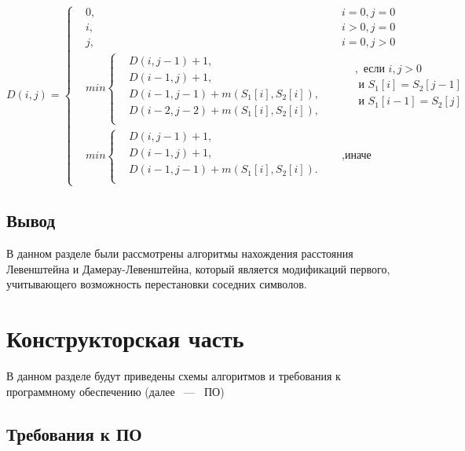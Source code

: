 \documentclass[14pt,russian]{scrartcl}
\begin{document}
\[ D(i, j) =  \left\{
	\begin{aligned}
		  & 0, &   & i = 0, j = 0 \\
		  & i, &   & i > 0, j = 0 \\
		  & j, &   & i = 0, j > 0 \\		    	
		&min \left\{
		\begin{aligned}
		&D(i, j - 1) + 1,\\
		&D(i - 1, j) + 1,\\
		&D(i - 1, j - 1) + m(S_{1}[i], S_{2}[i]), \\
		&D(i - 2, j - 2) + m(S_{1}[i], S_{2}[i]),\\
	\end{aligned} \right.
	&& 
	\begin{aligned}
		  & , \text{ если } i, j > 0         \\
		  & \text{ и } S_{1}[i] = S_{2}[j - 1]  \\
		  & \text{ и } S_{1}[i - 1] =  S_{2}[j] \\
	\end{aligned} \\ 
	&min \left\{
	\begin{aligned}
		  & D(i, j - 1) + 1,                         \\
		  & D(i - 1, j) + 1,                         \\
		  & D(i - 1, j - 1) + m(S_{1}[i], S_{2}[i]). \\
	\end{aligned} \right.  &&, \text{иначе}
	\end{aligned} \right.
\]	
	    
\subsection{Вывод}
В данном разделе были рассмотрены алгоритмы нахождения расстояния Левенштейна и Дамерау-Левенштейна, который является модификаций первого, учитывающего возможность перестановки соседних символов. 
		
\section{Конструкторская часть}

В данном разделе будут приведены схемы алгоритмов и требования к программному обеспечению (далее ~---~ ПО)

\subsection{Требования к ПО}
\end{document}
